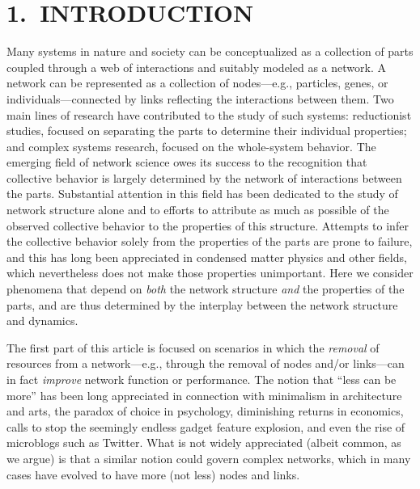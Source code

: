 \documentclass[
preprint,
superscriptaddress,
aps,
prl,
]{revtex4-1}
\begin{document}
\section{1.~INTRODUCTION}

Many systems in nature and society can be conceptualized as a collection of parts coupled through a web of interactions and suitably modeled as a network. A network can be represented as 
 {\color{black} a} collection of nodes---e.g., particles, genes, or individuals---connected by links reflecting the interactions between them. Two main lines of research have contributed to the study of such systems:  reductionist studies, focused on separating the parts to determine their individual properties; and complex systems research, focused on the whole-system behavior. The emerging field of network science 
  {\color{black} owes}
  its success to the recognition that collective behavior is largely determined by the network of interactions between the parts. Substantial attention in this field has been dedicated to the study of network structure alone and to efforts to attribute as much as possible of  the observed collective behavior to the properties of this structure. 
Attempts to infer the collective behavior 
solely from the properties of the parts
 {\color{black} are}
prone to failure, and this has long been appreciated in condensed matter physics and other fields, which nevertheless does not make those properties unimportant.  Here we consider phenomena that 
 {\color{black} depend}
on {\it both} the network structure {\it and} the properties of the parts, and 
 {\color{black} are}
thus determined by the interplay between the network structure and dynamics. 

The first part of this article is focused on scenarios in which the {\it removal}  of resources from a network---e.g., through the removal of nodes and/or links---can in fact {\it improve} network function or performance. 
The notion that ``less can be more'' has been long appreciated in connection with minimalism in architecture and arts, the paradox of choice in psychology, diminishing returns in economics, calls to stop the seemingly endless gadget feature explosion, 
and even the rise of microblogs such as Twitter. What is not widely appreciated (albeit common, as we argue) is that a similar notion could govern complex networks, which in many cases have evolved to have more (not less) nodes and links. 
\end{document}
